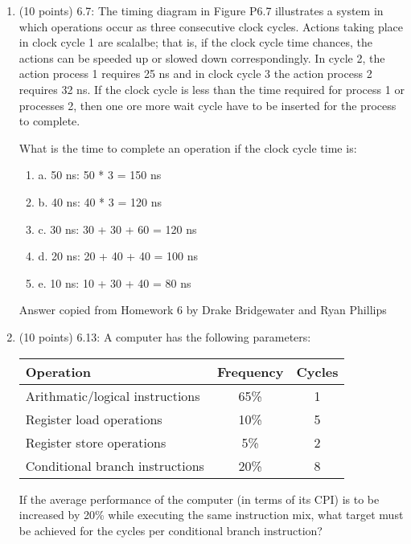 \documentclass[letterpaper,10pt,onecolumn,titlepage]{article}
\begin{document}
\begin{enumerate}

\item (10 points) 6.7: The timing diagram in Figure P6.7 illustrates a system in which operations occur as three consecutive clock cycles. Actions taking place in clock cycle 1 are scalalbe; that is, if the clock cycle time chances, the actions can be speeded up or slowed down correspondingly. In cycle 2, the action process 1 requires 25 ns and in clock cycle 3 the action process 2 requires 32 ns. If the clock cycle is less than the time required for process 1 or processes 2, then one ore more wait cycle have to be inserted for the process to complete.

What is the time to complete an operation if the clock cycle time is:

\begin{mdframed}[style=MyFrame]
\begin{enumerate}
\item{a.} 50 ns: 50 * 3 = 150 ns
\item{b.} 40 ns: 40 * 3 = 120 ns
\item{c.} 30 ns: 30 + 30 + 60 = 120 ns
\item{d.} 20 ns: 20 + 40 + 40 = 100 ns
\item{e.} 10 ns: 10 + 30 + 40 = 80 ns
\end{enumerate}
Answer copied from Homework 6 by Drake Bridgewater and Ryan Phillips \cite{HW6}
\end{mdframed}
\newpage
\item (10 points) 6.13: A computer has the following parameters:\\
\begin{center}
\begin{tabular}{l | c | c}
\textbf{Operation} & \textbf{Frequency} & \textbf{Cycles}\\ \hline
Arithmatic/logical instructions& 65\% & 1\\
Register load operations& 10\% & 5\\
Register store operations& 5\% & 2\\
Conditional branch instructions& 20\% & 8 \\
\end{tabular}
\end{center}

If the average performance of the computer (in terms of its CPI) is to be increased by 20\% while executing the same instruction mix, what target must be achieved for the cycles per conditional branch instruction?


\end{enumerate}
\end{document}
